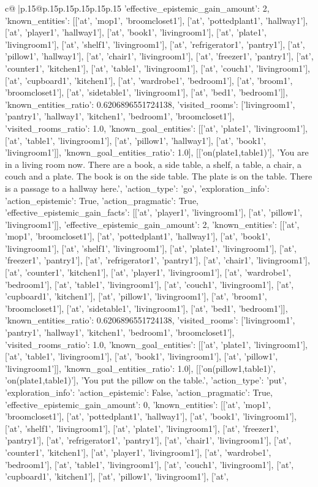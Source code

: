 \documentclass{article}
\begin{document}
{\begin{supertabular}{c@{$\;$}|p{.15\linewidth}@{}p{.15\linewidth}p{.15\linewidth}p{.15\linewidth}p{.15\linewidth}p{.15\linewidth}}
{{{'effective_epistemic_gain_amount': 2, 'known_entities': [['at', 'mop1', 'broomcloset1'], ['at', 'pottedplant1', 'hallway1'], ['at', 'player1', 'hallway1'], ['at', 'book1', 'livingroom1'], ['at', 'plate1', 'livingroom1'], ['at', 'shelf1', 'livingroom1'], ['at', 'refrigerator1', 'pantry1'], ['at', 'pillow1', 'hallway1'], ['at', 'chair1', 'livingroom1'], ['at', 'freezer1', 'pantry1'], ['at', 'counter1', 'kitchen1'], ['at', 'table1', 'livingroom1'], ['at', 'couch1', 'livingroom1'], ['at', 'cupboard1', 'kitchen1'], ['at', 'wardrobe1', 'bedroom1'], ['at', 'broom1', 'broomcloset1'], ['at', 'sidetable1', 'livingroom1'], ['at', 'bed1', 'bedroom1']], 'known_entities_ratio': 0.6206896551724138, 'visited_rooms': ['livingroom1', 'pantry1', 'hallway1', 'kitchen1', 'bedroom1', 'broomcloset1'], 'visited_rooms_ratio': 1.0, 'known_goal_entities': [['at', 'plate1', 'livingroom1'], ['at', 'table1', 'livingroom1'], ['at', 'pillow1', 'hallway1'], ['at', 'book1', 'livingroom1']], 'known_goal_entities_ratio': 1.0}}], [['on(plate1,table1)'], 'You are in a living room now. There are a book, a side table, a shelf, a table, a chair, a couch and a plate. The book is on the side table. The plate is on the table. There is a passage to a hallway here.', {'action_type': 'go', 'exploration_info': {'action_epistemic': True, 'action_pragmatic': True, 'effective_epistemic_gain_facts': [['at', 'player1', 'livingroom1'], ['at', 'pillow1', 'livingroom1']], 'effective_epistemic_gain_amount': 2, 'known_entities': [['at', 'mop1', 'broomcloset1'], ['at', 'pottedplant1', 'hallway1'], ['at', 'book1', 'livingroom1'], ['at', 'shelf1', 'livingroom1'], ['at', 'plate1', 'livingroom1'], ['at', 'freezer1', 'pantry1'], ['at', 'refrigerator1', 'pantry1'], ['at', 'chair1', 'livingroom1'], ['at', 'counter1', 'kitchen1'], ['at', 'player1', 'livingroom1'], ['at', 'wardrobe1', 'bedroom1'], ['at', 'table1', 'livingroom1'], ['at', 'couch1', 'livingroom1'], ['at', 'cupboard1', 'kitchen1'], ['at', 'pillow1', 'livingroom1'], ['at', 'broom1', 'broomcloset1'], ['at', 'sidetable1', 'livingroom1'], ['at', 'bed1', 'bedroom1']], 'known_entities_ratio': 0.6206896551724138, 'visited_rooms': ['livingroom1', 'pantry1', 'hallway1', 'kitchen1', 'bedroom1', 'broomcloset1'], 'visited_rooms_ratio': 1.0, 'known_goal_entities': [['at', 'plate1', 'livingroom1'], ['at', 'table1', 'livingroom1'], ['at', 'book1', 'livingroom1'], ['at', 'pillow1', 'livingroom1']], 'known_goal_entities_ratio': 1.0}}], [['on(pillow1,table1)', 'on(plate1,table1)'], 'You put the pillow on the table.', {'action_type': 'put', 'exploration_info': {'action_epistemic': False, 'action_pragmatic': True, 'effective_epistemic_gain_amount': 0, 'known_entities': [['at', 'mop1', 'broomcloset1'], ['at', 'pottedplant1', 'hallway1'], ['at', 'book1', 'livingroom1'], ['at', 'shelf1', 'livingroom1'], ['at', 'plate1', 'livingroom1'], ['at', 'freezer1', 'pantry1'], ['at', 'refrigerator1', 'pantry1'], ['at', 'chair1', 'livingroom1'], ['at', 'counter1', 'kitchen1'], ['at', 'player1', 'livingroom1'], ['at', 'wardrobe1', 'bedroom1'], ['at', 'table1', 'livingroom1'], ['at', 'couch1', 'livingroom1'], ['at', 'cupboard1', 'kitchen1'], ['at', 'pillow1', 'livingroom1'], ['at', }}}
\end{supertabular}}
\end{document}
